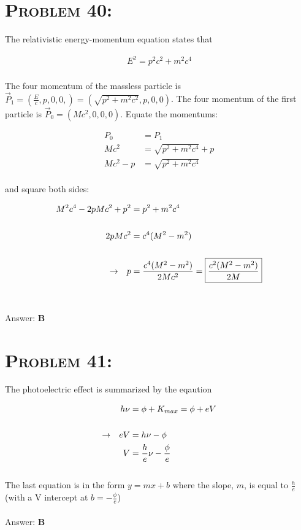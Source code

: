 \documentclass{article}
\begin{document}
\section{\textsc{Problem 40:}} The relativistic energy-momentum equation states that

\begin{align}
E^{2} = p^{2}c^{2} + m^{2}c^{4}
\end{align}
\\
The four momentum of the massless particle is $\vec{P}_{1} = (\frac{E}{c},p,0,0,) = (\sqrt{p^2+m^2c^2},p,0,0)$. The four momentum of the first particle is $\vec{P}_{0}=(Mc^{2},0,0,0)$. Equate the momentums:

\begin{align}
P_{0} &= P_{1}\nonumber\\
M^{}c^{2} &=  \sqrt{p^2+m^2c^4} + p^{}\nonumber\\
M^{}c^{2} -p^{} &=  \sqrt{p^2+m^2c^4}\nonumber
\end{align}
\\
and square both sides:

\begin{align}
M^{2}c^{4} - 2p M c^{2} + p^{2} &=  p^2+m^2c^4\nonumber\\
\nonumber\\
2pMc^{2} &= c^{4}(M^{2}-m^{2}) \nonumber\\
\nonumber\\
\rightarrow \hspace{.1in} p &=  \frac{c^{4}(M^{2}-m^{2})}{2Mc^{2}} = \boxed{\frac{c^{2}(M^{2}-m^{2})}{2M}}\nonumber
\end{align}
\\\\
Answer: \textbf{\textcolor{ProcessBlue}B}\\


\section{\textsc{Problem 41:}} The photoelectric effect is summarized by the eqaution

\begin{align}
h \nu &= \phi + K_{max}= \phi + e V\\
\nonumber\\
\rightarrow \hspace{.1in} eV &= h \nu - \phi \nonumber\\
V &=  \frac{h}{e} \nu - \frac{\phi}{e} \nonumber
\end{align}
\\
The last equation is in the form $y = mx + b$ where the slope, $m$, is equal to $\frac{h}{e}$ (with a V intercept at $b = -\frac{\phi}{e}$)
\\\\
Answer: \textbf{\textcolor{ProcessBlue}B}\\
\end{document}
